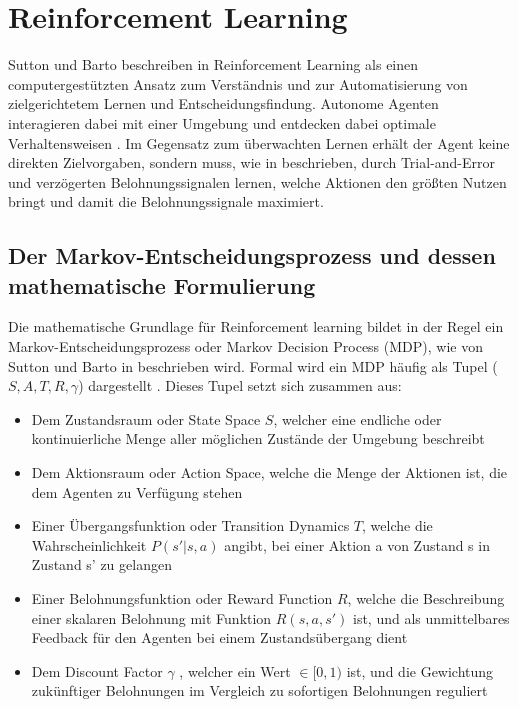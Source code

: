 \section{Reinforcement Learning}
Sutton und Barto beschreiben in \cite{sutton2018reinforcement} Reinforcement Learning als einen computergestützten Ansatz zum Verständnis und zur Automatisierung von zielgerichtetem Lernen und Entscheidungsfindung. Autonome Agenten interagieren dabei mit einer Umgebung und entdecken dabei optimale Verhaltensweisen \cite{silverRewardEnough2021, arulkumaranDRL2017, Kober_IJRR_2013}. Im Gegensatz zum überwachten Lernen erhält der Agent keine direkten Zielvorgaben, sondern muss, wie in \cite{sutton2018reinforcement} beschrieben, durch Trial-and-Error und verzögerten Belohnungssignalen lernen, welche Aktionen den größten Nutzen bringt und damit die Belohnungssignale maximiert.
\subsection{Der Markov-Entscheidungsprozess und dessen mathematische Formulierung} \label{MDP} %
Die mathematische Grundlage für Reinforcement learning bildet in der Regel ein Markov-Entscheidungsprozess oder Markov Decision Process (MDP), wie von Sutton und Barto in \cite{sutton2018reinforcement} beschrieben wird. Formal wird ein MDP häufig als Tupel ($S, A, T, R, \gamma$) dargestellt \cite{francois-lavetIntroductionDeepReinforcement2018, skalseDefiningCharacterizingReward2025, moralesSurveyDeepLearning2021}. \newline
Dieses Tupel setzt sich zusammen aus:
\begin{itemize}
	\item Dem Zustandsraum oder State Space $S$, welcher eine endliche oder kontinuierliche Menge aller möglichen Zustände der Umgebung beschreibt 
	\item Dem Aktionsraum oder Action Space, welche die Menge der Aktionen ist, die dem Agenten zu Verfügung stehen
	\item Einer Übergangsfunktion oder Transition Dynamics $T$, welche die Wahrscheinlichkeit $P(s'|s, a)$ angibt, bei einer Aktion a von Zustand s in Zustand s' zu gelangen
	\item Einer Belohnungsfunktion oder Reward Function $R$, welche die Beschreibung einer skalaren Belohnung mit Funktion $R(s, a, s')$ ist, und als unmittelbares Feedback für den Agenten bei einem Zustandsübergang dient
	\item Dem Discount Factor $\gamma$ , welcher ein Wert $\in [0, 1)$ ist, und die Gewichtung zukünftiger Belohnungen im Vergleich zu sofortigen Belohnungen reguliert
\end{itemize}

